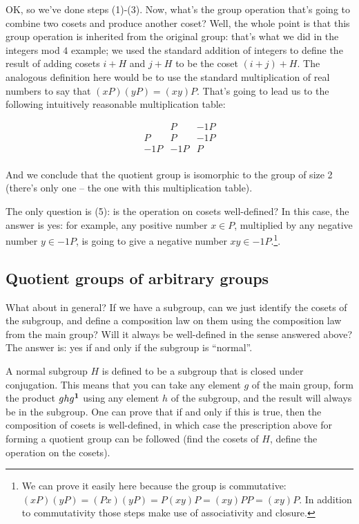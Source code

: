 OK, so we've done steps (1)-(3). Now, what's the group operation that's going
to combine two cosets and produce another coset? Well, the whole point is that
this group operation is inherited from the original group: that's what we did
in the integers mod $4$ example; we used the standard addition of integers to
define the result of adding cosets $i+H$ and $j+H$ to be the coset
$(i+j)+H$. The analogous definition here would be to use the standard
multiplication of real numbers to say that $(xP)(yP) = (xy)P$. That's going to
lead us to the following intuitively reasonable multiplication table:

$$
\begin{array}{ c|cc }
 ~   & P   & -1P \\
 \hline
 P   & P   & -1P \\
 -1P & -1P & P \\
\end{array}
$$

And we conclude that the quotient group is isomorphic to the group of size 2
(there's only one -- the one with this multiplication table).

The only question is (5): is the operation on cosets well-defined? In this
case, the answer is yes: for example, any positive number $x \in P$, multiplied
by any negative number $y \in -1P$, is going to give a negative number $xy \in
-1P$.\footnote{We can prove it easily here because the group is commutative:
$(xP)(yP) = (Px)(yP) = P(xy)P = (xy)PP = (xy)P$. In addition to commutativity
those steps make use of associativity and closure.}.


\subsection{Quotient groups of arbitrary groups}

What about in general? If we have a subgroup, can we just identify the cosets
of the subgroup, and define a composition law on them using the composition law
from the main group? Will it always be well-defined in the sense answered
above? The answer is: yes if and only if the subgroup is ``normal''.

A normal subgroup $H$ is defined to be a subgroup that is closed under
conjugation. This means that you can take any element $g$ of the main group,
form the product $ghg^{\mathbf 1}$ using any element $h$ of the subgroup, and the result
will always be in the subgroup. One can prove that if and only if this is true,
then the composition of cosets is well-defined, in which case the prescription
above for forming a quotient group can be followed (find the cosets of $H$,
define the operation on the cosets).

